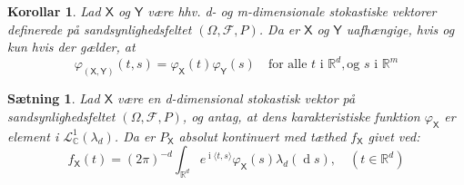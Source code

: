 \documentclass{article}
\newcommand{\R}{\mathbb{R}}
\newcommand{\C}{\mathbb{C}}
\newcommand{\1}{\mathbbm{1}}
\newcommand{\X}{\mathsf{X}}
\newcommand{\Y}{\mathsf{Y}}
\newcommand{\lclass}{\mathcal{L}}
\newcommand{\deriv}{\operatorname{d}}
\newcommand{\icomp}{\operatorname{i}}
\newcommand{\varx}{\varphi_\X}
\newcommand{\pfield}{(\Omega, \mathcal{F}, P)}
\newtheorem{corollary}[theorem]{Korollar}
\newtheorem{proposition}[theorem]{Sætning}
\theoremstyle{boxed}
\begin{document}
\begin{theorem-box}
    \begin{corollary}
        Lad $\X$ og $\Y$ være hhv. d- og m-dimensionale stokastiske vektorer definerede på sandsynlighedsfeltet $\pfield$. Da er $\X$ og $\Y$ uafhængige, hvis og kun hvis der gælder, at $$\varphi_{(\X,\Y)}(t,s)=\varx(t)\varphi_\Y(s)\quad \text{for alle }t\text{ i }\R^d, \text{og }s\text{ i }\R^m$$
    \end{corollary}
\end{theorem-box}
\begin{theorem-box}
    \begin{proposition}
        Lad $\X$ være en d-dimensional stokastisk vektor på sandsynlighedsfeltet $\pfield$, og antag, at dens karakteristiske funktion $\varx$ er element i $\lclass^1_{\C}(\lambda_d)$. Da er $P_\X$ absolut kontinuert med tæthed $f_\X$ givet ved:
        $$f_\X(t)=(2\pi)^{-d}\int_{\R^d}e^{\icomp \langle t,s\rangle}\varx(s)\lambda_d(\deriv s), \quad (t\in\R^d)$$
    \end{proposition}
\end{theorem-box}
\end{document}
